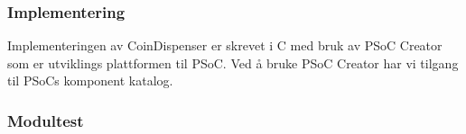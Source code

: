 \documentclass[Rapport/Rapport_main.tex]{subfiles}
\begin{document}
\subsubsection{Implementering}
Implementeringen av CoinDispenser er skrevet i C med bruk av PSoC Creator som er utviklings plattformen til PSoC. Ved å bruke PSoC Creator har vi tilgang til PSoCs komponent katalog.
\subsubsection{Modultest}
\end{document}
